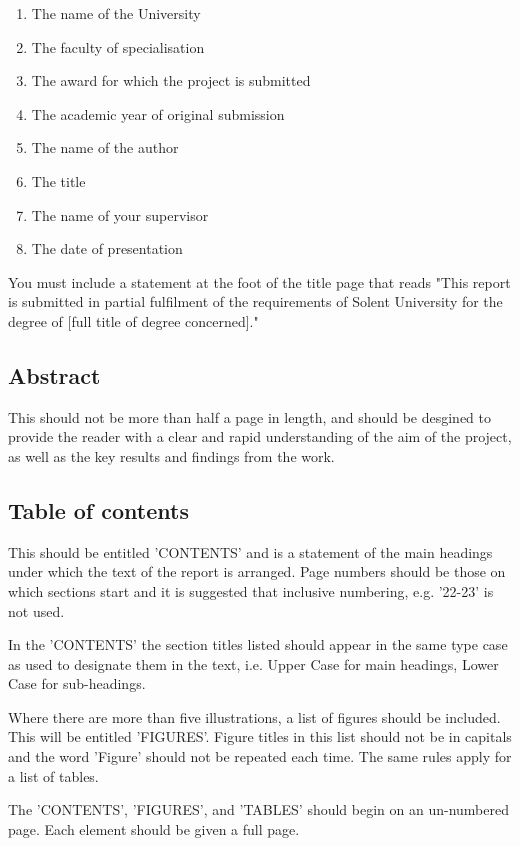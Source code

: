 \begin{enumerate}
    \item The name of the University
    \item The faculty of specialisation
    \item The award for which the project is submitted
    \item The academic year of original submission
    \item The name of the author
    \item The title
    \item The name of your supervisor
    \item The date of presentation
\end{enumerate}

You must include a statement at the foot of the title page that reads "This report is submitted in partial fulfilment of the requirements of Solent University for the degree of [full title of degree concerned]."


\subsection{Abstract}

This should not be more than half a page in length, and should be desgined to provide the reader with a clear and rapid understanding of the aim of the project, as well as the key results and findings from the work.

\subsection{Table of contents}

This should be entitled 'CONTENTS' and is a statement of the main headings under which the text of the report is arranged. Page numbers should be those on which sections start and it is suggested that inclusive numbering, e.g. '22-23' is not used.

In the 'CONTENTS' the section titles listed should appear in the same type case as used to designate them in the text, i.e. Upper Case for main headings, Lower Case for sub-headings. 

Where there are more than five illustrations, a list of figures should be included. This will be entitled 'FIGURES'. Figure titles in this list should not be in capitals and the word 'Figure' should not be repeated each time. The same rules apply for a list of tables. 

The 'CONTENTS', 'FIGURES', and 'TABLES' should begin on an un-numbered page. Each element should be given a full page.

